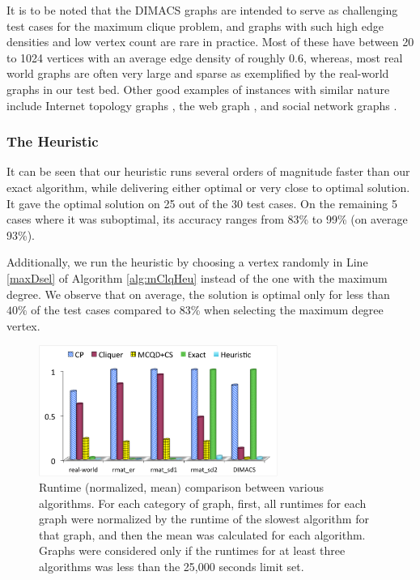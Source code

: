 It is to be noted that the DIMACS graphs are intended to serve as challenging test cases for the maximum clique problem, and graphs with such high edge densities and low vertex count are rare in practice. 
Most of these have between 20 to 1024 vertices with an average edge density of roughly 0.6, 
whereas, most real world graphs are often very large and sparse
as exemplified by the real-world graphs in our test bed.
Other good examples of instances with similar nature include Internet topology graphs \cite{Faloutsos:1999:PRI:316188.316229}, the web graph \cite{kumar:extracting}, and social network graphs \cite{Domingos:2001:MNV:502512.502525}.


\subsubsection{The Heuristic}
\label{sec:exp-heuristic}

It can be seen that our heuristic runs several orders of magnitude faster than our exact algorithm,
while delivering either optimal or very close to optimal solution.
It gave the optimal solution on 25 out of the 30 test cases.
On the remaining 5 cases where it was suboptimal, its accuracy ranges from 83\% to 99\% (on average 93\%).

Additionally, we run the heuristic by choosing a vertex randomly in Line \ref{maxDsel} of Algorithm \ref{alg:mClqHeu} instead of the one with the maximum degree. We observe that on average, the solution is optimal only for less than $40\%$ of the test cases compared to 83\% when selecting the maximum degree vertex.


\begin{figure}
  \centering
    \includegraphics[width=7.8cm]{maxclqplot.pdf}
  \caption{Runtime (normalized, mean) comparison between various algorithms. For each category of graph, first, all runtimes for each graph were normalized by the runtime of the slowest algorithm for that graph, and then the mean was calculated for each algorithm. Graphs were considered only if the runtimes for at least three algorithms was less than the 25,000 seconds limit set.}
\label{fig-timeplot}
\end{figure}





